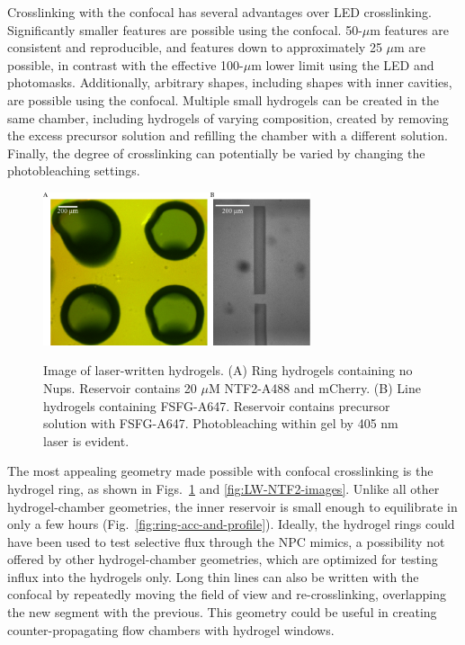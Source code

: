 
Crosslinking with the confocal has several advantages over LED crosslinking.  Significantly smaller features are possible using the confocal.  50-$\mu$m features are consistent and reproducible, and features down to approximately 25 $\mu$m are possible, in contrast with the effective 100-$\mu$m lower limit using the LED and photomasks.  Additionally, arbitrary shapes, including shapes with inner cavities, are possible using the confocal.  Multiple small hydrogels can be created in the same chamber, including hydrogels of varying composition, created by removing the excess precursor solution and refilling the chamber with a different solution.  Finally, the degree of crosslinking can potentially be varied by changing the photobleaching settings.

\begin{figure} %
\caption[Laser-written hydrogels.]{Image of laser-written hydrogels. (A) Ring hydrogels containing no Nups.  Reservoir contains 20 $\mu$M NTF2-A488 and mCherry. (B) Line hydrogels containing FSFG-A647. Reservoir contains precursor solution with FSFG-A647. Photobleaching within gel by 405 nm laser is evident.}
\centering
\includegraphics[width=0.7\textwidth]{figs/ch03/example-LW-gels}
\label{fig:LW-gel-images}
\end{figure} %

The most appealing geometry made possible with confocal crosslinking is the hydrogel ring, as shown in Figs.~\ref{fig:LW-gel-images} and \ref{fig:LW-NTF2-images}.  Unlike all other hydrogel-chamber geometries, the inner reservoir is small enough to equilibrate in only a few hours (Fig.~\ref{fig:ring-acc-and-profile}).  Ideally, the hydrogel rings could have been used to test selective flux through the NPC mimics, a possibility not offered by other hydrogel-chamber geometries, which are optimized for testing influx into the hydrogels only.  Long thin lines can also be written with the confocal by repeatedly moving the field of view and re-crosslinking, overlapping the new segment with the previous.  This geometry could be useful in creating counter-propagating flow chambers with hydrogel windows.


